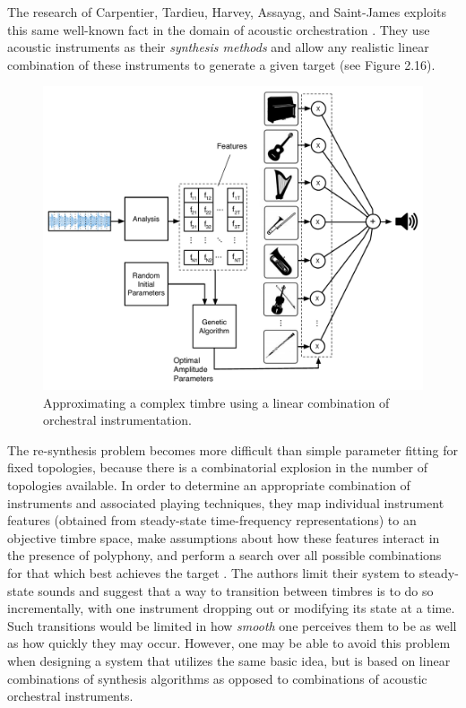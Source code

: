 \documentclass[12pt]{report} 	%
\numberwithin{figure}{chapter}
\numberwithin{table}{chapter}
\numberwithin{equation}{chapter}
\begin{document}
\begin{flushleft}
The research of Carpentier, Tardieu, Harvey, Assayag, and Saint-James exploits this same well-known fact in the domain of acoustic orchestration \cite{Carpentier:2010fh}. They use acoustic instruments as their \textit{synthesis methods} and allow any realistic linear combination of these instruments to generate a given target (see Figure 2.16). 
\begin{figure}[h!]
\begin{center}
\includegraphics[scale=0.55]{OrchestralMetaSynthesis}
\caption[Searching for linear combinations of orchestral instruments]{Approximating a complex timbre using a linear combination of orchestral instrumentation.}
\end{center}
\end{figure}
The re-synthesis problem becomes more difficult than simple parameter fitting for fixed topologies, because there is a combinatorial explosion in the number of topologies available. In order to determine an appropriate combination of instruments and associated playing techniques, they map individual instrument features (obtained from steady-state time-frequency representations) to an objective timbre space, make assumptions about how these features interact in the presence of polyphony, and perform a search over all possible combinations for that which best achieves the target \cite[p. 2]{Carpentier:2010fh}. The authors limit their system to steady-state sounds and suggest that a way to transition between timbres is to do so incrementally, with one instrument dropping out or modifying its state at a time. Such transitions would be limited in how \textit{smooth} one perceives them to be as well as how quickly they may occur. However, one may be able to avoid this problem when designing a system that utilizes the same basic idea, but is based on linear combinations of synthesis algorithms as opposed to combinations of acoustic orchestral instruments.


\end{flushleft}
\end{document}
